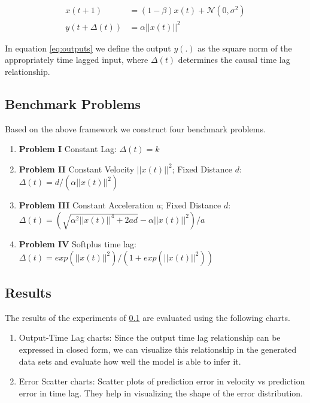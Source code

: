 \documentclass[twoside]{article}
\begin{document}
\begin{align}
 x(t+1) &= (1 - \beta) x(t) + \mathcal{N}(0, \sigma^2) \label{eq:data}\\
 y(t+\Delta(t)) &= \alpha ||x(t)||^2 \label{eq:outputs}
\end{align}

In equation \ref{eq:outputs} we define the output $y(.)$ as the square norm
of the appropriately time lagged input, where $\Delta(t)$ determines the causal
time lag relationship.

\subsection{Benchmark Problems}\label{sec:benchmark}

Based on the above framework we construct four benchmark problems.

\begin{enumerate}
\item \textbf{Problem I} Constant Lag: \newline 
$\Delta(t) = k$

\item \textbf{Problem II} Constant Velocity $||x(t)||^2$; Fixed Distance $d$: 
\newline $\Delta(t) = d/(\alpha ||x(t)||^2)$

\item \textbf{Problem III} Constant Acceleration $a$; Fixed Distance $d$: 
\newline $\Delta(t) = (\sqrt{\alpha^2||x(t)||^4 + 2ad} - \alpha||x(t)||^2)/a$

\item \textbf{Problem IV} Softplus time lag: 
\newline $\Delta(t) = exp\left(||x(t)||^2\right)/\left(1 + exp(||x(t)||^2)\right)$

\end{enumerate}

\subsection{Results}

The results of the experiments of \ref{sec:benchmark} are evaluated using the following charts.

\begin{enumerate}
    \item Output-Time Lag charts: Since the output time lag relationship can be expressed in closed form, we can visualize this relationship in the generated data sets and evaluate how well the model is able to infer it.
    \item Error Scatter charts: Scatter plots of prediction error in velocity vs prediction error in time lag. They help in visualizing the shape of the error distribution.
\end{enumerate}
\end{document}
